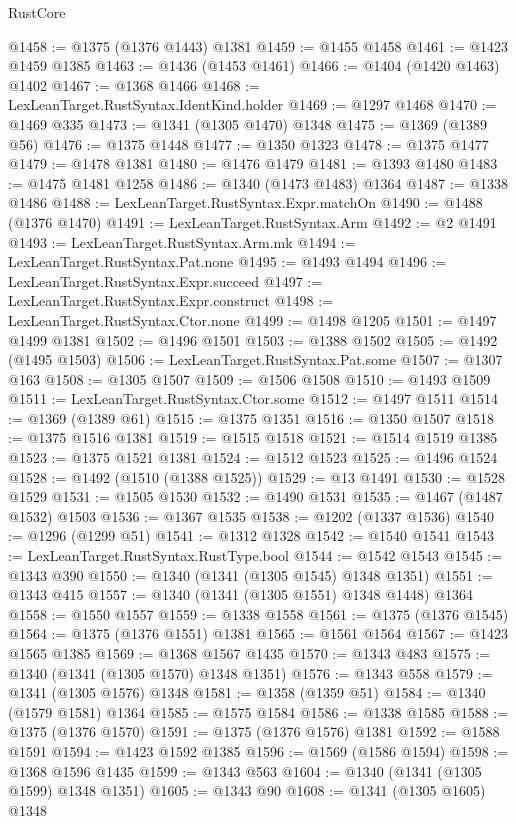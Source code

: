 \begin{lexlean}{RustCore}
\begin{coremodule}
@1458 := @1375 (@1376 @1443) @1381
@1459 := @1455 @1458
@1461 := @1423 @1459 @1385
@1463 := @1436 (@1453 @1461)
@1466 := @1404 (@1420 @1463) @1402
@1467 := @1368 @1466
@1468 := LexLeanTarget.RustSyntax.IdentKind.holder
@1469 := @1297 @1468
@1470 := @1469 @335
@1473 := @1341 (@1305 @1470) @1348
@1475 := @1369 (@1389 @56)
@1476 := @1375 @1448
@1477 := @1350 @1323
@1478 := @1375 @1477
@1479 := @1478 @1381
@1480 := @1476 @1479
@1481 := @1393 @1480
@1483 := @1475 @1481 @1258
@1486 := @1340 (@1473 @1483) @1364
@1487 := @1338 @1486
@1488 := LexLeanTarget.RustSyntax.Expr.matchOn
@1490 := @1488 (@1376 @1470)
@1491 := LexLeanTarget.RustSyntax.Arm
@1492 := @2 @1491
@1493 := LexLeanTarget.RustSyntax.Arm.mk
@1494 := LexLeanTarget.RustSyntax.Pat.none
@1495 := @1493 @1494
@1496 := LexLeanTarget.RustSyntax.Expr.succeed
@1497 := LexLeanTarget.RustSyntax.Expr.construct
@1498 := LexLeanTarget.RustSyntax.Ctor.none
@1499 := @1498 @1205
@1501 := @1497 @1499 @1381
@1502 := @1496 @1501
@1503 := @1388 @1502
@1505 := @1492 (@1495 @1503)
@1506 := LexLeanTarget.RustSyntax.Pat.some
@1507 := @1307 @163
@1508 := @1305 @1507
@1509 := @1506 @1508
@1510 := @1493 @1509
@1511 := LexLeanTarget.RustSyntax.Ctor.some
@1512 := @1497 @1511
@1514 := @1369 (@1389 @61)
@1515 := @1375 @1351
@1516 := @1350 @1507
@1518 := @1375 @1516 @1381
@1519 := @1515 @1518
@1521 := @1514 @1519 @1385
@1523 := @1375 @1521 @1381
@1524 := @1512 @1523
@1525 := @1496 @1524
@1528 := @1492 (@1510 (@1388 @1525))
@1529 := @13 @1491
@1530 := @1528 @1529
@1531 := @1505 @1530
@1532 := @1490 @1531
@1535 := @1467 (@1487 @1532) @1503
@1536 := @1367 @1535
@1538 := @1202 (@1337 @1536)
@1540 := @1296 (@1299 @51)
@1541 := @1312 @1328
@1542 := @1540 @1541
@1543 := LexLeanTarget.RustSyntax.RustType.bool
@1544 := @1542 @1543
@1545 := @1343 @390
@1550 := @1340 (@1341 (@1305 @1545) @1348 @1351)
@1551 := @1343 @415
@1557 := @1340 (@1341 (@1305 @1551) @1348 @1448) @1364
@1558 := @1550 @1557
@1559 := @1338 @1558
@1561 := @1375 (@1376 @1545)
@1564 := @1375 (@1376 @1551) @1381
@1565 := @1561 @1564
@1567 := @1423 @1565 @1385
@1569 := @1368 @1567 @1435
@1570 := @1343 @483
@1575 := @1340 (@1341 (@1305 @1570) @1348 @1351)
@1576 := @1343 @558
@1579 := @1341 (@1305 @1576) @1348
@1581 := @1358 (@1359 @51)
@1584 := @1340 (@1579 @1581) @1364
@1585 := @1575 @1584
@1586 := @1338 @1585
@1588 := @1375 (@1376 @1570)
@1591 := @1375 (@1376 @1576) @1381
@1592 := @1588 @1591
@1594 := @1423 @1592 @1385
@1596 := @1569 (@1586 @1594)
@1598 := @1368 @1596 @1435
@1599 := @1343 @563
@1604 := @1340 (@1341 (@1305 @1599) @1348 @1351)
@1605 := @1343 @90
@1608 := @1341 (@1305 @1605) @1348

\end{coremodule}
\end{lexlean}
